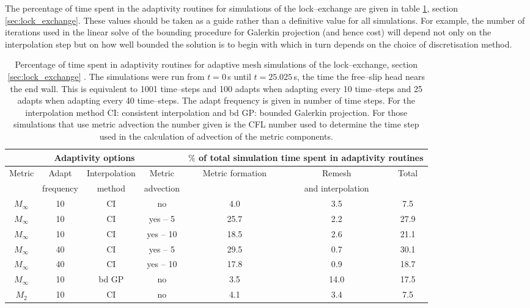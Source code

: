 The percentage of time spent in the adaptivity routines for simulations of the lock--exchange are given in table \ref{table:adaptivity_cost}, section \ref{sec:lock_exchange}. These values should be taken as a guide rather than a definitive value for all simulations. For example, the number of iterations used in the linear solve of the bounding procedure for Galerkin projection (and hence cost) will depend not only on the interpolation step but on how well bounded the solution is to begin with which in turn depends on the choice of discretisation method.

\begin{table}[h]
\centering
\begin{tabular}{|c|c|c|c|c|c|c|} \hline
\multicolumn{4}{|c|}{Adaptivity options} & \multicolumn{3}{c|}{$\%$ of total simulation time spent in adaptivity routines} \\ \hline
Metric & Adapt & Interpolation & Metric      &   Metric formation    & Remesh & Total          \\             
                & frequency & method & advection &                       &  and interpolation    &                \\ \hline                                              
$M_\infty$ & 10 & CI & no              &  4.0                  &    3.5               &   7.5               \\    
$M_\infty$ & 10 & CI & yes -- 5              &  25.7                 &    2.2                & 27.9             \\       
$M_\infty$ & 10 & CI & yes -- 10            & 18.5                 &    2.6                & 21.1             \\   
$M_\infty$ & 40 & CI & yes -- 5           &  29.5                 &    0.7                &   30.1         \\     
$M_\infty$ & 40 & CI & yes -- 10           &  17.8                &   0.9                &  18.7            \\      
 $M_\infty$ & 10 & bd GP & no          & 3.5                   &   14.0                &  17.5             \\                         
$M_2$ & 10 & CI & no	& 4.1			& 3.4			& 7.5		 \\ \hline
\end{tabular}
\caption[Percentage of total simulation run time spent in adaptive mesh routines for adaptive mesh simulations of the lock--exchange.]{Percentage of time spent in adaptivity routines for adaptive mesh simulations of the lock--exchange, section \ref{sec:lock_exchange} \citep{hiester2011}. The simulations were run from $t=0\,$s until $t=25.025\,$s, the time the free--slip head nears the end wall. This is equivalent to 1001 time--steps and 100 adapts when adapting every 10 time--steps and 25 adapts when adapting every 40 time--steps. The adapt frequency is given in number of time steps. For the interpolation method CI: consistent interpolation and bd GP: bounded Galerkin projection. For those simulations that use metric advection the number given is the CFL number used to determine the time step used in the calculation of advection of the metric components.}
\label{table:adaptivity_cost}
\end{table}

